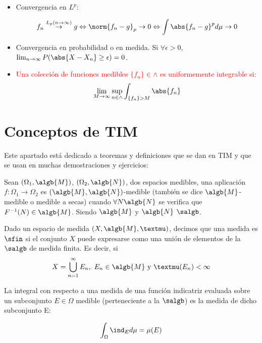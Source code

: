 \documentclass{apuntes}
\begin{document}
\begin{itemize}
\item Convergencia en $L^p$:

\[
f_n \stackrel{L_p (n\rightarrow \infty)}{\rightarrow} g \Leftrightarrow \norm{f_n -g}_p  \rightarrow 0 \Leftrightarrow \int{\abs{f_n -g}^pd\mu} \rightarrow 0
\]

\item Convergencia en probabilidad o en medida. Si $\forall \epsilon >0$, $\lim_{n \rightarrow \infty}P(\abs{X-X_n}\geq \epsilon)=0$.

\item \textcolor{red}{ Una colección de funciones medibles $\{f_n\} \in \wedge$ es uniformemente integrable si:
\[
\lim_{M \rightarrow \infty} \sup_{n \in \wedge} \int_{\{f_n\} > M} \abs{f_n}
\]
}

\end{itemize}

\section{Conceptos de TIM}
Este apartado está dedicado a teoremas y definiciones que se dan en TIM y que se usan en muchas demostraciones y ejercicios:

\begin{defn}
Sean $(\Omega_1, \algb{M})$, $(\Omega_2, \algb{N})$, dos espacios medibles, una aplicación $f:\Omega_1 \rightarrow \Omega_2$ es $(\algb{M}, \algb{N})$-medible (también se dice $\algb{M}$-medible o medible a secas) cuando $\forall N \algb{N}$ se verifica que $F^{-1}(N) \in \algb{M}$. Siendo $\algb{M}$ y $\algb{N}$ $\salgb$.
\end{defn}

\begin{defn}\label{defSigmaFinita}
Dado un espacio de medida $(X, \algb{M}, µ)$, decimos que una medida es $\sfin$ si el conjunto $X$ puede expresarse como una unión de elementos de la $\salgb$ de medida finita. Es decir, si \[X=\bigcup_{n=1}^{\infty}E_n, \ E_n \in \algb{M} \text{ y }µ(E_n)< \infty\]
\end{defn}

\begin{defn}
La integral con respecto a una medida de una función indicatriz evaluada sobre un subconjunto $E \in \Omega$ medible (perteneciente a la $\salgb$) es la medida de dicho subconjunto E:

\[\int_{\Omega} \ind_{E}d\mu = \mu(E)\]
\end{defn}
\end{document}
